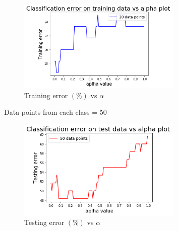 \documentclass[a4 paper]{article}
\begin{document}
\begin{figure}[!htb]
    \centering
    \includegraphics[width=0.7\textwidth]{MLE_train.png}
    \caption{Training error $(\%)$ vs $\alpha$}
    \label{fig:2}
\end{figure}

Data points from each class = 50

\begin{figure}[!htb]
    \centering
    \includegraphics[width=0.7\textwidth]{MLE_test.png}
    \caption{Testing error $(\%)$ vs $\alpha$}
    \label{fig:2}
\end{figure}
\end{document}
